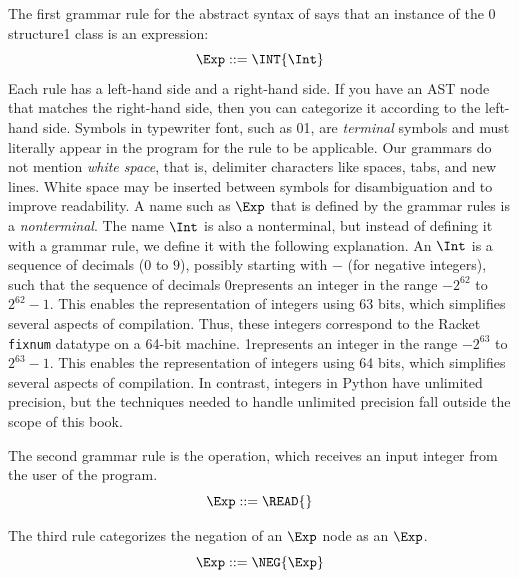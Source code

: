 \documentclass[7x10]{TimesAPriori_MIT}%
\def\racketEd{0}
\def\pythonEd{1}
\def\edition{1}
\newcommand{\racket}[1]{{\if\edition\racketEd{#1}\fi}}
\newcommand{\pythonColor}[0]{}
\newcommand{\python}[1]{{\if\edition\pythonEd\pythonColor #1\fi}}
\numberwithin{theorem}{chapter}
\numberwithin{definition}{chapter}
\numberwithin{equation}{chapter}
\begin{document}
The first grammar rule for the abstract syntax of \LangInt{} says that an
instance of the \racket{ structure}\python{ class} is an expression:
\begin{equation}
\Exp ::= \INT{\Int}  \label{eq:arith-int}
\end{equation}
%
Each rule has a left-hand side and a right-hand side.
If you have an AST node that matches the
right-hand side, then you can categorize it according to the
left-hand side.
%
Symbols in typewriter font, such as \racket{}\python{},
are \emph{terminal} symbols and must literally appear in the program for the
rule to be applicable.
%
Our grammars do not mention \emph{white space}, that is, delimiter
characters like spaces, tabs, and new lines. White space may be
inserted between symbols for disambiguation and to improve
readability.  
%
A name such as $\Exp$ that is defined by the grammar rules is a
\emph{nonterminal}.  
%
The name $\Int$ is also a nonterminal, but instead of defining it with
a grammar rule, we define it with the following explanation.  An
$\Int$ is a sequence of decimals ($0$ to $9$), possibly starting with
$-$ (for negative integers), such that the sequence of decimals
%
\racket{represents an integer in the range $-2^{62}$ to $2^{62}-1$.  This
enables the representation of integers using 63 bits, which simplifies
several aspects of compilation.
%
Thus, these integers correspond to the Racket \texttt{fixnum}
datatype on a 64-bit machine.}
%
\python{represents an integer in the range $-2^{63}$ to $2^{63}-1$.  This
enables the representation of integers using 64 bits, which simplifies
several aspects of compilation. In contrast, integers in Python have
unlimited precision, but the techniques needed to handle unlimited
precision fall outside the scope of this book.}

The second grammar rule is the \READOP{} operation, which receives an
input integer from the user of the program.
\begin{equation}
  \Exp ::= \READ{} \label{eq:arith-read}
\end{equation}

The third rule categorizes the negation of an $\Exp$ node as an
$\Exp$.
\begin{equation}
  \Exp ::= \NEG{\Exp}  \label{eq:arith-neg}
\end{equation}
\end{document}
